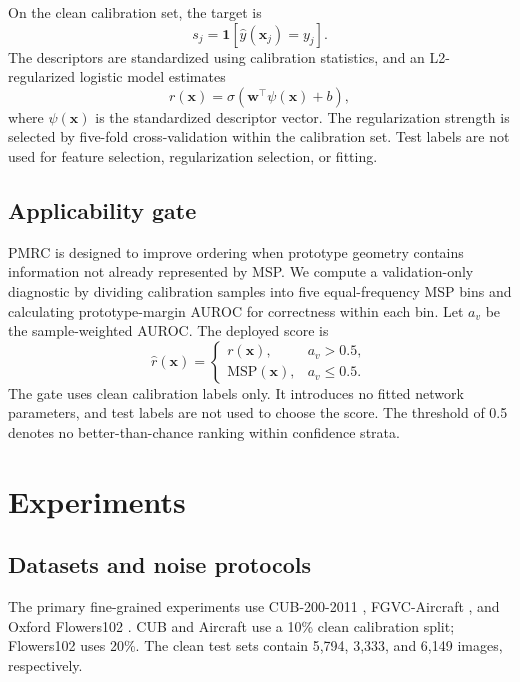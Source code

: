 \documentclass[review,times]{elsarticle}
\newcommand{\method}{PMRC}
\newcommand{\vect}[1]{\mathbf{#1}}
\newcommand{\indicator}{\mathbf{1}}
\begin{document}
On the clean calibration set, the target is
\begin{equation}
  s_j=\indicator\left[\hat y(\vect{x}_j)=y_j\right].
  \label{eq:correctness}
\end{equation}
The descriptors are standardized using calibration statistics, and an L2-regularized logistic model estimates
\begin{equation}
  r(\vect{x})=\sigma\left(\vect{w}^{\top}\psi(\vect{x})+b\right),
  \label{eq:calibrator}
\end{equation}
where $\psi(\vect{x})$ is the standardized descriptor vector. The regularization strength is selected by five-fold cross-validation within the calibration set. Test labels are not used for feature selection, regularization selection, or fitting.

\subsection{Applicability gate}

\method{} is designed to improve ordering when prototype geometry contains information not already represented by MSP. We compute a validation-only diagnostic by dividing calibration samples into five equal-frequency MSP bins and calculating prototype-margin AUROC for correctness within each bin. Let $a_v$ be the sample-weighted AUROC. The deployed score is
\begin{equation}
  \hat r(\vect{x})=
  \begin{cases}
    r(\vect{x}), & a_v>0.5,\\
    \mathrm{MSP}(\vect{x}), & a_v\le0.5.
  \end{cases}
  \label{eq:gate}
\end{equation}
The gate uses clean calibration labels only. It introduces no fitted network parameters, and test labels are not used to choose the score. The threshold of 0.5 denotes no better-than-chance ranking within confidence strata.

\section{Experiments}

\subsection{Datasets and noise protocols}

The primary fine-grained experiments use CUB-200-2011 \citep{wah2011cub}, FGVC-Aircraft \citep{maji2013aircraft}, and Oxford Flowers102 \citep{nilsback2008flowers}. CUB and Aircraft use a 10\% clean calibration split; Flowers102 uses 20\%. The clean test sets contain 5,794, 3,333, and 6,149 images, respectively.
\end{document}
